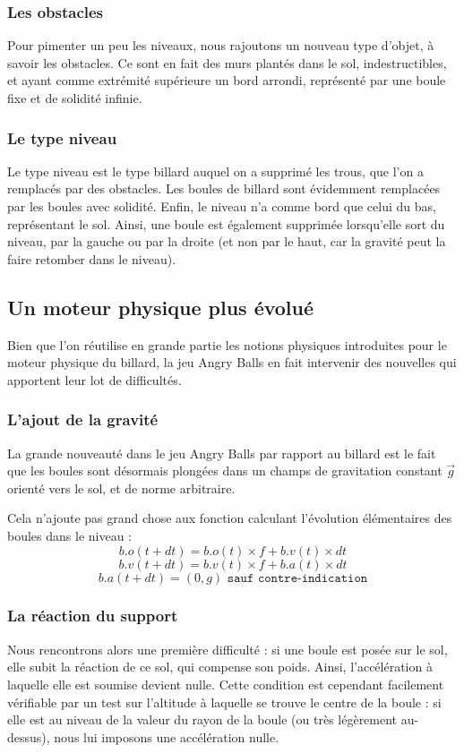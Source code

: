 \documentclass[a4paper,11pt]{article}
\begin{document}
\subsubsection{Les obstacles}
Pour pimenter un peu les niveaux, nous rajoutons un nouveau type d'objet, à savoir les obstacles. Ce sont en
fait des murs plantés dans le sol, indestructibles, et ayant comme extrémité supérieure un bord arrondi, représenté
par une boule fixe et de solidité infinie. 

\subsubsection{Le type niveau}
Le type niveau est le type billard auquel on a supprimé les trous, que l'on a remplacés par des obstacles.
Les boules de billard sont évidemment remplacées par les boules avec solidité. Enfin, le niveau n'a comme bord
que celui du bas, représentant le sol. Ainsi, une boule est également supprimée lorsqu'elle sort du niveau, par
la gauche ou par la droite (et non par le haut, car la gravité peut la faire retomber dans le niveau).

\subsection{Un moteur physique plus évolué}
Bien que l'on réutilise en grande partie les notions physiques introduites pour le moteur physique du billard,
la jeu Angry Balls en fait intervenir des nouvelles qui apportent leur lot de difficultés.

\subsubsection{L'ajout de la gravité}
La grande nouveauté dans le jeu Angry Balls par rapport au billard est le fait que les boules sont désormais
plongées dans un champs de gravitation constant $\vec{g}$ orienté vers le sol, et de norme arbitraire.

Cela n'ajoute pas grand chose aux fonction calculant l'évolution élémentaires des boules dans le niveau :
\[b.o(t + dt) = b.o(t)\times f + b.v(t)\times dt\]
\[b.v(t + dt) = b.v(t)\times f + b.a(t)\times dt\]
\[b.a(t + dt) = (0,g) \texttt{ sauf contre-indication}\]

\subsubsection{La réaction du support}
Nous rencontrons alors une première difficulté : si une boule est posée sur le sol, elle subit la réaction de
ce sol, qui compense son poids. Ainsi, l'accélération à laquelle elle est soumise devient nulle. Cette condition
est cependant facilement vérifiable par un test sur l'altitude à laquelle se trouve le centre de la boule : si elle
est au niveau de la valeur du rayon de la boule (ou très légèrement au-dessus), nous lui imposons une accélération
nulle. 
\end{document}
